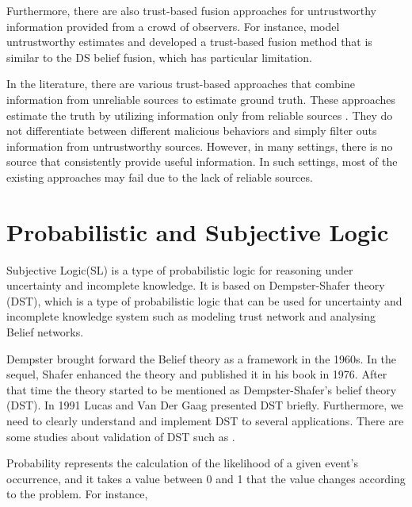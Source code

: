 \documentclass[a4,12pt]{ozu-thesis}
\begin{document}
Furthermore, there are also trust-based fusion approaches for untrustworthy information provided from a crowd of observers. For instance, \cite{venanzi2013trust} model untrustworthy estimates and developed a trust-based fusion method that is similar to the DS belief fusion, which has particular limitation.

In the literature, there are various trust-based approaches that combine information from unreliable sources to estimate ground
truth. These approaches estimate the truth by utilizing information only from reliable sources \cite{teacy2006travos, whitby2004filtering}. They do not differentiate between different malicious behaviors and simply filter outs information from untrustworthy sources. However, in many settings, there is no source that consistently provide useful information. In such settings, most of the existing approaches may fail due to the lack of reliable sources.



\section{Probabilistic and Subjective Logic}

Subjective Logic(SL) is a type of probabilistic logic for reasoning under uncertainty and incomplete knowledge. It is based on Dempster-Shafer theory (DST), which is a type of probabilistic logic that can be used for uncertainty and incomplete knowledge system such as modeling trust network and analysing Belief networks.


Dempster brought forward the Belief theory as a framework in the 1960s. In the sequel, Shafer enhanced the theory and published it in his book \cite{shafer1976mathematical} in 1976. After that time the theory started to be mentioned as Dempster-Shafer's belief theory (DST). In 1991 Lucas and Van Der Gaag \cite{lucas1991principles} presented DST briefly. Furthermore, we need to clearly understand and implement DST to several applications. There are some studies about validation of DST such as \cite{dezert2012validity}.


Probability represents the calculation of the likelihood of a given event's occurrence, and it takes a value between 0 and 1 that the value changes according to the problem. For instance, 
\end{document}
